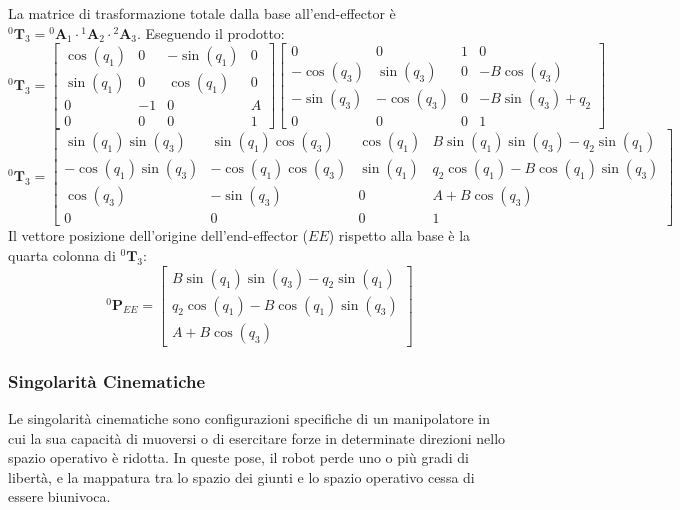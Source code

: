 \documentclass[11pt, a4paper]{report}
\begin{document}
La matrice di trasformazione totale dalla base all'end-effector è $^{0}\bm{T}_{3} = {^{0}\bm{A}_{1}} \cdot {^{1}\bm{A}_{2}} \cdot {^{2}\bm{A}_{3}}$. Eseguendo il prodotto:
\[
    ^{0}\bm{T}_{3} =
    \begin{bmatrix}
        \cos(q_1) & 0 & -\sin(q_1) & 0 \\
        \sin(q_1) & 0 & \cos(q_1) & 0 \\
        0 & -1 & 0 & A \\
        0 & 0 & 0 & 1
    \end{bmatrix}
    \begin{bmatrix}
        0 & 0 & 1 & 0 \\
        - \cos(q_3) & \sin(q_3) & 0 & - B \cos(q_3) \\
        - \sin(q_3) & - \cos(q_3) & 0 & - B \sin(q_3) + q_2 \\
        0 & 0 & 0 & 1
    \end{bmatrix}
\]
\[
    ^{0}\bm{T}_{3} =
    \begin{bmatrix}
        \sin(q_1)\sin(q_3) & \sin(q_1)\cos(q_3) & \cos(q_1) & B\sin(q_1)\sin(q_3) - q_2\sin(q_1) \\
        -\cos(q_1)\sin(q_3) & -\cos(q_1)\cos(q_3) & \sin(q_1) & q_2\cos(q_1) - B\cos(q_1)\sin(q_3) \\
        \cos(q_3) & -\sin(q_3) & 0 & A+B\cos(q_3) \\
        0 & 0 & 0 & 1
    \end{bmatrix}
\]
Il vettore posizione dell'origine dell'end-effector (\(EE\)) rispetto alla base è la quarta colonna di $^{0}\bm{T}_{3}$:
\[
    ^{0}\bm{P}_{EE} =
    \begin{bmatrix}
        B\sin(q_{1})\sin(q_{3}) - q_{2}\sin(q_{1}) \\
        q_{2}\cos(q_{1}) - B\cos(q_{1})\sin(q_{3}) \\
        A + B\cos(q_{3})
    \end{bmatrix}
\]
\newpage
\subsubsection{Singolarità Cinematiche}

Le singolarità cinematiche sono configurazioni specifiche di un manipolatore in cui la sua capacità di muoversi o di esercitare forze in determinate direzioni nello spazio operativo è ridotta. In queste pose, il robot perde uno o più gradi di libertà, e la mappatura tra lo spazio dei giunti e lo spazio operativo cessa di essere biunivoca.
\end{document}
